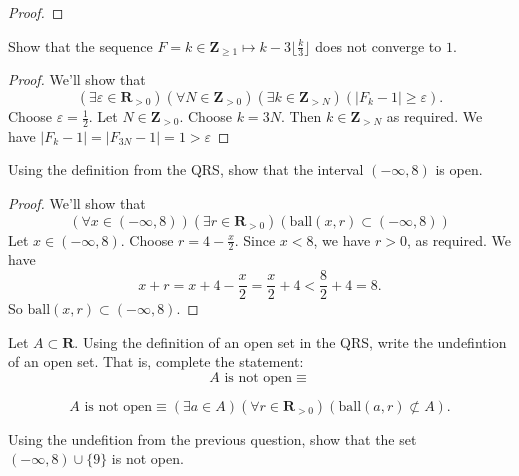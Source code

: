 \documentclass[12pt, fleqn, answers]{exam}
\newcommand{\reals}{\mathbf{R}}
\newcommand{\integers}{\mathbf{Z}}
\newcommand{\ball}{\mathrm{ball}}
\begin{document}
\begin{questions}
\begin{solution}
\begin{proof}
\end{proof}
\end{solution}
\question Show that the sequence $F = k \in \integers_{\geq 1} \mapsto k - 3 \lfloor \frac{k}{3} \rfloor $ does 
not converge to $1$.

\begin{solution}
\begin{proof}  We'll show that
\begin{equation*}
  \left(\exists \varepsilon \in \reals_{> 0} \right)
  \left(\forall  N \in \integers_{> 0} \right)
   \left(\exists  k \in \integers_{> N} \right)
   \left(  | F_k - 1 | \geq \varepsilon \right).
\end{equation*}
Choose $\varepsilon = \frac{1}{2}$. Let $N \in \integers_{>0}$. Choose $k = 3 N$. Then $k  \in \integers_{> N}$
as required. We have $|F_k - 1| = |F_{3 N} -1 | = 1 > \varepsilon$
\end{proof}
\end{solution}

\question Using the definition from the QRS, show that the interval $(-\infty, 8)$ is open.

\begin{solution}
\begin{proof} We'll show that 
\begin{equation*}
   \left(\forall x \in (-\infty, 8)\right) \left(\exists r \in \reals_{>0}\right)(\ball(x,r)  \subset (-\infty, 8))
\end{equation*}
Let $x \in   (-\infty, 8)$. Choose $r = 4 - \frac{x}{2}$. Since $x < 8$, we have $r > 0$, as required.  
We have 
\begin{equation*}
x + r = x + 4  - \frac{x}{2} = \frac{x}{2} + 4 < \frac{8}{2} + 4 = 8.
\end{equation*}
So $\ball(x,r)  \subset (-\infty, 8)$.
\end{proof}
\end{solution}

\question Let $A \subset \reals$.  Using the definition of an open set in the QRS, write
the undefintion of an open set. That is, complete the statement:
\begin{equation*}
  A \text{ is not open} \equiv 
\end{equation*}

\begin{solution}
\begin{equation*}
  A \text{ is not open} \equiv \left(\exists a \in A\right) \left(\forall r \in \reals_{>0}\right) \left(\ball(a,r) \not \subset A \right).
 \end{equation*}
\end{solution}
\question Using the undefition from the previous question, show that the set \mbox{$(-\infty, 8) \cup \{9 \}$} is
not open.


\end{questions}
\end{document}
